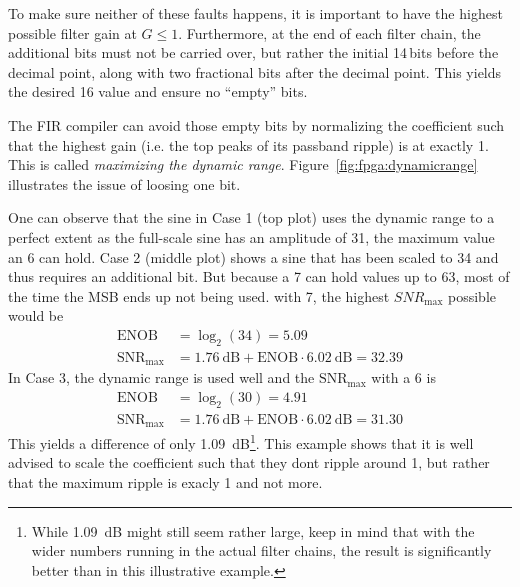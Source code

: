 To make  sure neither  of these faults  happens, it is  important to  have the
highest possible  filter gain at $G  \leq 1$. Furthermore, at the  end of each
filter chain,  the additional bits  must not be  carried over, but  rather the
initial \num{14}\,bits  before the  decimal point,  along with  two fractional
bits after the decimal point. This  yields the desired \SI{16}{\bit} value and
ensure no ``empty'' bits.

The FIR  compiler can avoid  those empty  bits by normalizing  the coefficient
such  that the  highest  gain (i.e.  the  top peaks  of  its passband  ripple)
is  at  exactly   \num{1}.   This  is  called   \emph{maximizing  the  dynamic
range}. Figure~\ref{fig:fpga:dynamicrange}  illustrates the  issue of  loosing
one bit.

One can  observe that  the sine in  Case \num{1} (top  plot) uses  the dynamic
range to a perfect extent as the full-scale sine has an amplitude of \num{31},
the maximum  value an \SI{6}{\bit}   can hold. Case  \num{2} (middle
plot) shows  a sine  that has  been scaled  to \num{34}  and thus  requires an
additional bit.  But  because a \SI{7}{\bit}  can hold  values up to
\num{63}, most of the time the MSB  ends up not being used. with \SI{7}{\bit},
the highest $SNR_\mathrm{max}$ possible would be
\begin{align}
    \mathrm{ENOB}             &= \log_2(34) = 5.09 \nonumber \\
    \mathrm{SNR}_\mathrm{max} &= \SI{1.76}{\dB} + \mathrm{ENOB} \cdot \SI{6.02}{\dB} = 32.39
\end{align}
In   Case    \num{3},   the   dynamic    range   is   used   well    and   the
$\mathrm{SNR}_\mathrm{max}$ with a \SI{6}{\bit}  is
\begin{align}
    \mathrm{ENOB}             &= \log_2(30)  = 4.91 \nonumber\\
    \mathrm{SNR}_\mathrm{max} &= \SI{1.76}{\dB} + \mathrm{ENOB} \cdot \SI{6.02}{\dB} = 31.30
\end{align}
This yields a difference of only \SI{1.09}{\dB}\footnote{%
    While \SI{1.09}{\dB} might still seem rather large, keep in mind that with
    the  wider numbers  running in  the actual  filter chains,  the result  is
    significantly better than in this illustrative example.%
}.
This example shows that it is well  advised to scale the coefficient such that
they dont ripple around \num{1}, but  rather that the maximum ripple is exacly
\num{1} and not more.

